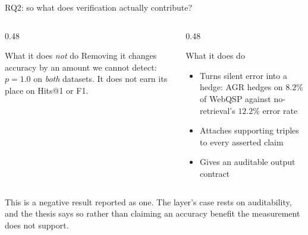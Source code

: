 \documentclass[aspectratio=169,12pt]{beamer}
\begin{document}
\begin{frame}{RQ2: so what does verification actually contribute?}
  \begin{columns}[T]
    \begin{column}{0.48\textwidth}
      \begin{block}{What it does \emph{not} do}
        \small
        Removing it changes accuracy by an amount we cannot detect:
        $p = 1.0$ on \emph{both} datasets. It does not earn its place on
        Hits@1 or F1.
      \end{block}
    \end{column}
    \begin{column}{0.48\textwidth}
      \begin{block}{What it does do}
        \small
        \begin{itemize}
          \item Turns silent error into a \alert{hedge}: AGR hedges on
            $8.2\%$ of WebQSP against no-retrieval's $12.2\%$ error rate
          \item Attaches \alert{supporting triples} to every asserted claim
          \item Gives an \alert{auditable output contract}
        \end{itemize}
      \end{block}
    \end{column}
  \end{columns}
  \vspace{2mm}
  {\small This is a negative result reported as one. The layer's case rests on
  auditability, and the thesis says so rather than claiming an accuracy
  benefit the measurement does not support.}
\end{frame}
\end{document}

